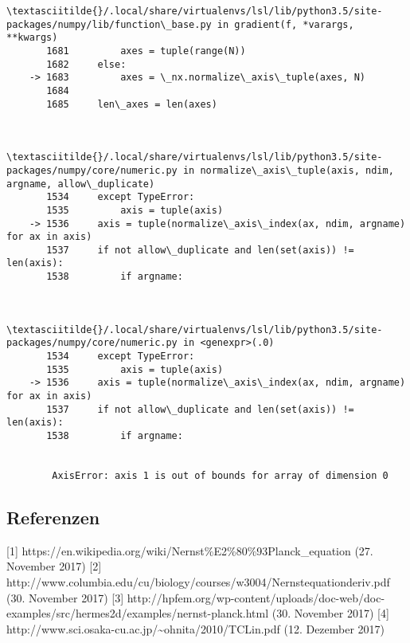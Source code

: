 \documentclass[11pt]{article}
\begin{document}
\begin{Verbatim}[commandchars=\\\{\}]
        \textasciitilde{}/.local/share/virtualenvs/lsl/lib/python3.5/site-packages/numpy/lib/function\_base.py in gradient(f, *varargs, **kwargs)
       1681         axes = tuple(range(N))
       1682     else:
    -> 1683         axes = \_nx.normalize\_axis\_tuple(axes, N)
       1684 
       1685     len\_axes = len(axes)


        \textasciitilde{}/.local/share/virtualenvs/lsl/lib/python3.5/site-packages/numpy/core/numeric.py in normalize\_axis\_tuple(axis, ndim, argname, allow\_duplicate)
       1534     except TypeError:
       1535         axis = tuple(axis)
    -> 1536     axis = tuple(normalize\_axis\_index(ax, ndim, argname) for ax in axis)
       1537     if not allow\_duplicate and len(set(axis)) != len(axis):
       1538         if argname:


        \textasciitilde{}/.local/share/virtualenvs/lsl/lib/python3.5/site-packages/numpy/core/numeric.py in <genexpr>(.0)
       1534     except TypeError:
       1535         axis = tuple(axis)
    -> 1536     axis = tuple(normalize\_axis\_index(ax, ndim, argname) for ax in axis)
       1537     if not allow\_duplicate and len(set(axis)) != len(axis):
       1538         if argname:


        AxisError: axis 1 is out of bounds for array of dimension 0

    \end{Verbatim}

    \subsection{Referenzen}\label{referenzen}

    {[}1{]} https://en.wikipedia.org/wiki/Nernst\%E2\%80\%93Planck\_equation
(27. November 2017) {[}2{]}
http://www.columbia.edu/cu/biology/courses/w3004/Nernstequationderiv.pdf
(30. November 2017) {[}3{]}
http://hpfem.org/wp-content/uploads/doc-web/doc-examples/src/hermes2d/examples/nernst-planck.html
(30. November 2017) {[}4{]}
http://www.sci.osaka-cu.ac.jp/\textasciitilde{}ohnita/2010/TCLin.pdf
(12. Dezember 2017)


    
    
    
    
\end{document}
